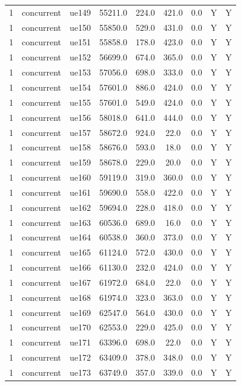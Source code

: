 \begin{table}[ht]
\begin{tabular}{|c|c|c|c|c|c|c|c|c|}
1 & concurrent & ue149 & 55211.0 & 224.0 & 421.0 & 0.0 & Y & Y \\
1 & concurrent & ue150 & 55850.0 & 529.0 & 431.0 & 0.0 & Y & Y \\
1 & concurrent & ue151 & 55858.0 & 178.0 & 423.0 & 0.0 & Y & Y \\
1 & concurrent & ue152 & 56699.0 & 674.0 & 365.0 & 0.0 & Y & Y \\
1 & concurrent & ue153 & 57056.0 & 698.0 & 333.0 & 0.0 & Y & Y \\
1 & concurrent & ue154 & 57601.0 & 886.0 & 424.0 & 0.0 & Y & Y \\
1 & concurrent & ue155 & 57601.0 & 549.0 & 424.0 & 0.0 & Y & Y \\
1 & concurrent & ue156 & 58018.0 & 641.0 & 444.0 & 0.0 & Y & Y \\
1 & concurrent & ue157 & 58672.0 & 924.0 & 22.0 & 0.0 & Y & Y \\
1 & concurrent & ue158 & 58676.0 & 593.0 & 18.0 & 0.0 & Y & Y \\
1 & concurrent & ue159 & 58678.0 & 229.0 & 20.0 & 0.0 & Y & Y \\
1 & concurrent & ue160 & 59119.0 & 319.0 & 360.0 & 0.0 & Y & Y \\
1 & concurrent & ue161 & 59690.0 & 558.0 & 422.0 & 0.0 & Y & Y \\
1 & concurrent & ue162 & 59694.0 & 228.0 & 418.0 & 0.0 & Y & Y \\
1 & concurrent & ue163 & 60536.0 & 689.0 & 16.0 & 0.0 & Y & Y \\
1 & concurrent & ue164 & 60538.0 & 360.0 & 373.0 & 0.0 & Y & Y \\
1 & concurrent & ue165 & 61124.0 & 572.0 & 430.0 & 0.0 & Y & Y \\
1 & concurrent & ue166 & 61130.0 & 232.0 & 424.0 & 0.0 & Y & Y \\
1 & concurrent & ue167 & 61972.0 & 684.0 & 22.0 & 0.0 & Y & Y \\
1 & concurrent & ue168 & 61974.0 & 323.0 & 363.0 & 0.0 & Y & Y \\
1 & concurrent & ue169 & 62547.0 & 564.0 & 430.0 & 0.0 & Y & Y \\
1 & concurrent & ue170 & 62553.0 & 229.0 & 425.0 & 0.0 & Y & Y \\
1 & concurrent & ue171 & 63396.0 & 698.0 & 22.0 & 0.0 & Y & Y \\
1 & concurrent & ue172 & 63409.0 & 378.0 & 348.0 & 0.0 & Y & Y \\
1 & concurrent & ue173 & 63749.0 & 357.0 & 339.0 & 0.0 & Y & Y \\

\end{tabular}
\end{table}
